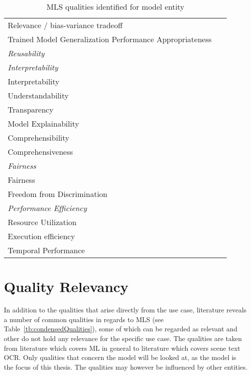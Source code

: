 \begin{table}[h]
\begin{tabular}{p{} p{}}
        Relevance / bias-variance tradeoff &~\cite{siebert_construction_2021, zhang_machine_2020} \\
        Trained Model Generalization Performance Appropriateness
                                                    &~\cite{nakamichi_requirements-driven_2020} \\
        \midrule
        \textit{Reusability} &~\cite{ashmore_assuring_2021} \\
        \midrule
        \textit{Interpretability} \\
        Interpretability &~\cite{ashmore_assuring_2021, siebert_construction_2021, zhang_machine_2020}\\
        Understandability &~\cite{nakamichi_requirements-driven_2020} \\
        Transparency &~\cite{arpteg_software_2018} \\
        Model Explainability &~\cite{vogelsang_requirements_2019} \\
        Comprehensibility &~\cite{ashmore_assuring_2021} \\
        Comprehensiveness &~\cite{ashmore_assuring_2021} \\
        \midrule
        \textit{Fairness}\\
        Fairness &~\cite{siebert_construction_2021, zhang_machine_2020} \\
        Freedom from Discrimination &~\cite{vogelsang_requirements_2019} \\
        \midrule
        \textit{Performance Efficiency} \\
        Resource Utilization &~\cite{siebert_construction_2021,
                                nakamichi_requirements-driven_2020} \\
        Execution efficiency &~\cite{siebert_construction_2021} \\
        Temporal Performance &~\cite{nakamichi_requirements-driven_2020} \\
        \bottomrule
    \end{tabular}
    \caption{MLS qualities identified for model entity\label{tb:LiteratureQualitiesModel}}
\end{table}
\FloatBarrier

\section{Quality Relevancy}
In addition to the qualities that arise directly from the use case, literature reveals a number of
common qualities in regards to \ac{MLS} (see Table~\ref{tb:condensedQualities}), some of which
can be regarded as relevant and other do not hold any relevance for the specific use case.
The qualities are taken from literature which covers \ac{ML} in general to literature
which covers scene text \ac{OCR}.
Only qualities that concern the model will be looked at, as the model is the focus of this thesis.
The qualities may however be influenced by other entities.

